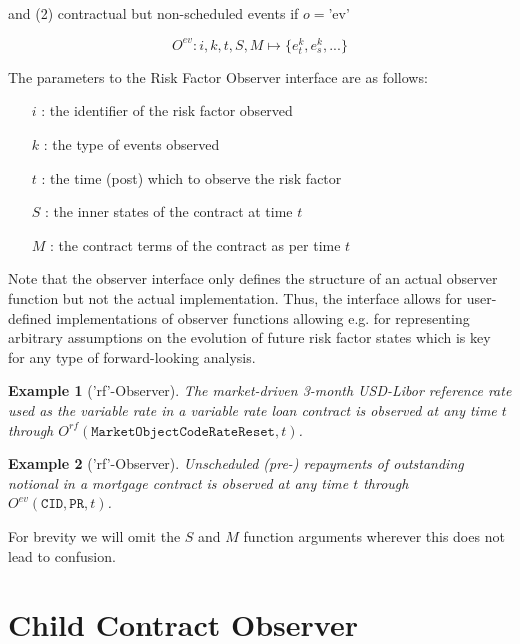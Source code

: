 \documentclass[9pt,oneside]{amsart}
\newtheorem{example}{Example}
\newcommand{\attr}[1]{\texttt{#1}}
\newcommand{\obs}[3]{O^{#1}(#2,#3)}
\newcommand{\obsfunc}[1]{O^{#1}}
\begin{document}
\begin{multicols}{2}
and (2) contractual but non-scheduled events if $o=$'ev'

\[
	\obsfunc{ev}: i,k,t,S,M \mapsto \{e_t^{k},e_s^{k},...\}
\]

The parameters to the Risk Factor Observer interface are as follows:

\begin{itemize}
	\item[$i$]: the identifier of the risk factor observed

	\item[$k$]: the type of events observed

	\item[$t$]: the time (post) which to observe the risk factor

	\item [$S$]: the inner states of the contract at time $t$

	\item [$M$]: the contract terms of the contract as per time $t$
\end{itemize}

Note that the observer interface only defines the structure of an actual observer function but not the actual implementation. Thus, the interface allows for user-defined implementations of observer functions allowing e.g. for representing arbitrary assumptions on the evolution of future risk factor states which is key for any type of forward-looking analysis.

\begin{example}['rf'-Observer] The market-driven 3-month USD-Libor reference rate used as the variable rate in a variable rate loan contract is observed at any time $t$ through $\obs{rf}{\attr{MarketObjectCodeRateReset}}{t}$.
\end{example}

\begin{example}['rf'-Observer] Unscheduled (pre-) repayments of outstanding notional in a mortgage contract is observed at any time $t$ through $\obs{ev}{\attr{CID},\attr{PR}}{t}$.
\end{example}

For brevity we will omit the $S$ and $M$ function arguments wherever this does not lead to confusion.



\section{Child Contract Observer}\label{sec:cldobserver}


\end{multicols}
\end{document}
